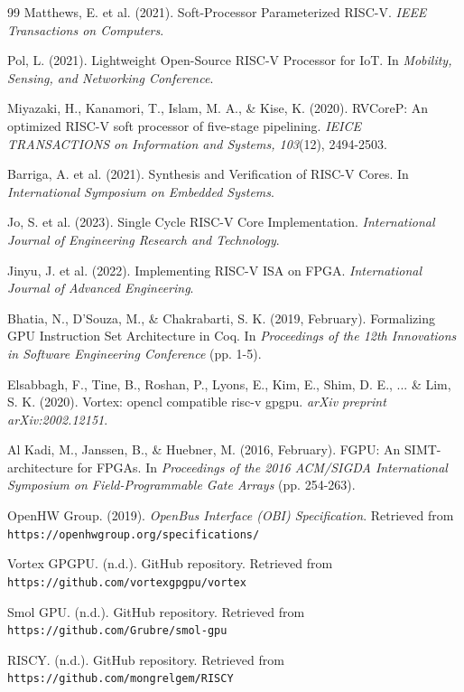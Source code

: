 \documentclass[a4paper,twoside]{article}
\begin{document}
\begin{thebibliography}{99}
Matthews, E. et al. (2021). Soft-Processor Parameterized RISC-V. \textit{IEEE Transactions on Computers}.

Pol, L. (2021). Lightweight Open-Source RISC-V Processor for IoT. In \textit{Mobility, Sensing, and Networking Conference}.

Miyazaki, H., Kanamori, T., Islam, M. A., \& Kise, K. (2020). RVCoreP: An optimized RISC-V soft processor of five-stage pipelining. \textit{IEICE TRANSACTIONS on Information and Systems, 103}(12), 2494-2503.

Barriga, A. et al. (2021). Synthesis and Verification of RISC-V Cores. In \textit{International Symposium on Embedded Systems}.

Jo, S. et al. (2023). Single Cycle RISC-V Core Implementation. \textit{International Journal of Engineering Research and Technology}.

Jinyu, J. et al. (2022). Implementing RISC-V ISA on FPGA. \textit{International Journal of Advanced Engineering}.

Bhatia, N., D'Souza, M., \& Chakrabarti, S. K. (2019, February). Formalizing GPU Instruction Set Architecture in Coq. In \textit{Proceedings of the 12th Innovations in Software Engineering Conference} (pp. 1-5).

Elsabbagh, F., Tine, B., Roshan, P., Lyons, E., Kim, E., Shim, D. E., ... \& Lim, S. K. (2020). Vortex: opencl compatible risc-v gpgpu. \textit{arXiv preprint arXiv:2002.12151}.

Al Kadi, M., Janssen, B., \& Huebner, M. (2016, February). FGPU: An SIMT-architecture for FPGAs. In \textit{Proceedings of the 2016 ACM/SIGDA International Symposium on Field-Programmable Gate Arrays} (pp. 254-263).

OpenHW Group. (2019). \textit{OpenBus Interface (OBI) Specification}. Retrieved from \texttt{https://openhwgroup.org/specifications/}

Vortex GPGPU. (n.d.). GitHub repository. Retrieved from \texttt{https://github.com/vortexgpgpu/vortex}

Smol GPU. (n.d.). GitHub repository. Retrieved from \texttt{https://github.com/Grubre/smol-gpu}

RISCY. (n.d.). GitHub repository. Retrieved from \texttt{https://github.com/mongrelgem/RISCY}

\end{thebibliography}
\end{document}
